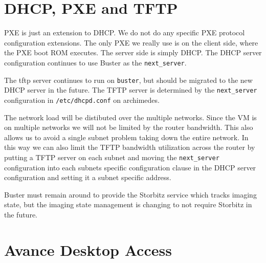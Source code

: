 \documentclass[twoside]{article}
\begin{document}
\section{DHCP, PXE and TFTP}

PXE is just an extension to DHCP.
We do not do any specific PXE protocol configuration extensions.
The only PXE we really use is on the client side, where the PXE boot ROM executes.
The server side is simply DHCP.
The DHCP server configuration continues to use Buster as the 
\verb+next_server+.

The tftp server continues to run on \verb+buster+, but should
be migrated to the new DHCP server in the future.
The TFTP server is determined by the \verb+next_server+ configuration in
\verb+/etc/dhcpd.conf+ on archimedes.

The network load will be distibuted over the multiple networks.
Since the VM is on multiple networks we will not be limited
by the router bandwidth.
This also allows us to avoid a single subnet problem taking down the
entire network.
In this way we can also limit the TFTP bandwidth utilization across
the router by putting a TFTP server on each subnet and moving the
\verb+next_server+ configuration into each subnets specific 
configuration clause in the DHCP server configuration and
setting it a subnet specific address.

Buster must remain around to provide the Storbitz service which tracks
imaging state,
but the imaging state management
is changing to not require Storbitz in the future.

%
%
%
%

\section{Avance Desktop Access}
\end{document}
